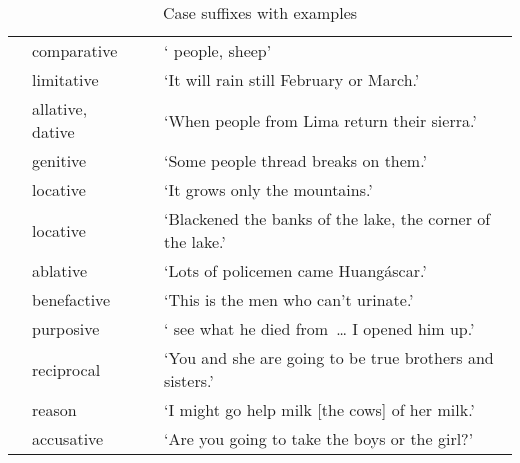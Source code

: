 {%
\begin{table}[!ht]
\renewcommand*\arraystretch{1.1}
\small\centering
\caption{Case suffixes with examples}\label{Tab11}
\begin{tabularx}{\textwidth}{l@{\hspace{1ex}}l@{\hspace{1ex}}L@{\hspace{1ex}}L}
\lsptoprule
{} & comparative &  & ‘ people,  sheep’	\\
 & limitative &  & ‘It will rain still  February or March.’	\\
 & allative, \mbox{dative}&  & ‘When people from Lima return  their sierra.’ \\
 & genitive &  & ‘Some people thread breaks on them.’	\\
 & locative &  & ‘It grows only  the mountains.’	\\
 & locative &  & ‘Blackened  the banks of the lake,  the corner of the lake.’	\\
 & ablative &  & ‘Lots of policemen came  Huangáscar.’	\\
 & benefactive &  & ‘This is  the men who can’t urinate.’	\\
 & purposive &  & ‘ see what he died from~\dots{} I opened him up.’	\\
 & reciprocal &  & ‘You and she are going to be true brothers and sisters.’	\\
 & reason &  & ‘I might go help milk [the cows]  of her milk.’	\\
 & accusative &  & ‘Are you going to take the boys or the girl?’	\\

\end{tabularx}
\end{table}}
